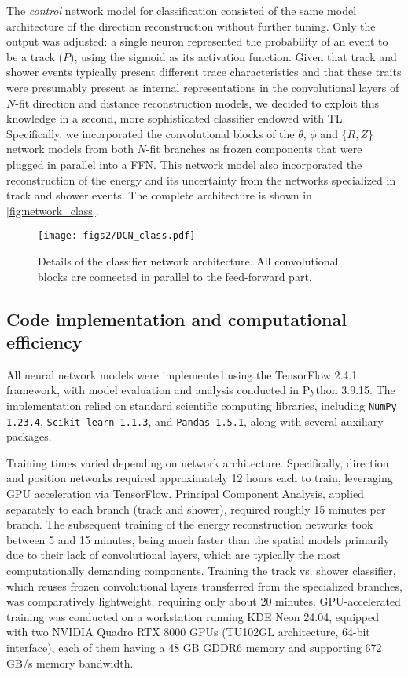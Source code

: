The \emph{control} network model for classification consisted of the same model architecture of the direction reconstruction without further tuning. Only the output was adjusted: a single neuron represented the probability of an event to be a track ($P$), using the sigmoid as its activation function. Given that track and shower events typically present different trace characteristics and that these traits were presumably present as internal representations in the convolutional layers of $N$-fit direction and distance reconstruction models, we decided to exploit this knowledge in a second, more sophisticated classifier endowed with TL. Specifically, we incorporated the convolutional blocks of the $\theta$, $\phi$ and $\{R,Z\}$ network models from both $N$-fit branches as frozen components that were plugged in parallel into a FFN. This network model also incorporated the reconstruction of the energy and its uncertainty from the networks specialized in track and shower events. The complete architecture is shown in \autoref{fig:network_class}.

\begin{figure}[htbp]
	\centering %
	\texttt{[image: figs2/DCN\_class.pdf]}
	\caption{\label{fig:network_class}Details of the classifier network architecture. All convolutional blocks are connected in parallel to the feed-forward part.}
\end{figure}

\subsection{Code implementation and computational efficiency}
\label{subsec:code}

All neural network models were implemented using the TensorFlow 2.4.1 framework, with model evaluation and analysis conducted in Python 3.9.15. The implementation relied on standard scientific computing libraries, including \texttt{NumPy 1.23.4}, \texttt{Scikit-learn 1.1.3}, and \texttt{Pandas 1.5.1}, along with several auxiliary packages.

Training times varied depending on network architecture. Specifically, direction and position networks required approximately 12 hours each to train, leveraging GPU acceleration via TensorFlow. Principal Component Analysis, applied separately to each branch (track and shower), required roughly 15 minutes per branch. The subsequent training of the energy reconstruction networks took between 5 and 15 minutes, being much faster than the spatial models primarily due to their lack of convolutional layers, which are typically the most computationally demanding components. Training the track vs. shower classifier, which reuses frozen convolutional layers transferred from the specialized branches, was comparatively lightweight, requiring only about 20 minutes. GPU-accelerated training was conducted on a workstation running KDE Neon 24.04, equipped with two NVIDIA Quadro RTX 8000 GPUs (TU102GL architecture, 64-bit interface), each of them having a 48 GB GDDR6 memory and supporting 672 GB/s memory bandwidth. %

